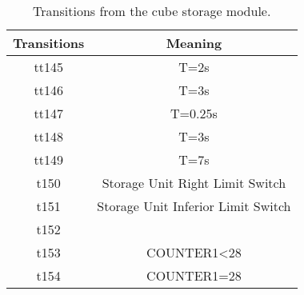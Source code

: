 \begin{table}[htbp]
\caption{Transitions from the cube storage module.}
\centering
\begin{tabular}{c|c}
Transitions & Meaning\\
\hline
tt145 & T=2s\\
tt146 & T=3s\\
tt147 & T=0.25s\\
tt148 & T=3s\\
tt149 & T=7s\\
t150 & Storage Unit Right Limit Switch\\
t151 & Storage Unit Inferior Limit Switch\\
t152 & \\
t153 & COUNTER1<28\\
t154 & COUNTER1=28\\
\end{tabular}
\end{table}
